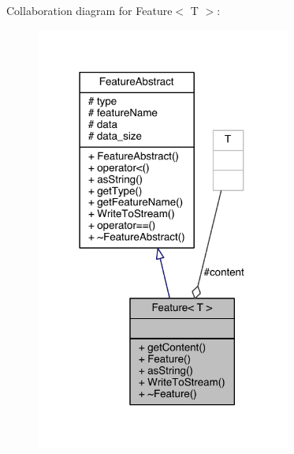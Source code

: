 Collaboration diagram for Feature$<$ T $>$\+:
\nopagebreak
\begin{figure}[H]
\begin{center}
\leavevmode
\includegraphics[width=238pt]{class_feature__coll__graph}
\end{center}
\end{figure}


